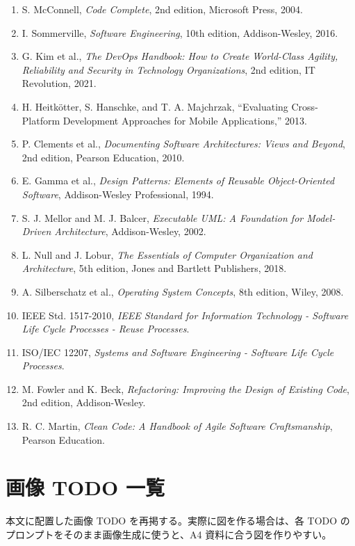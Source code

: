 \documentclass[a4paper,11pt,ja=standard,xelatex]{bxjsarticle}
\begin{document}
\begin{enumerate}
  \item S. McConnell, \textit{Code Complete}, 2nd edition, Microsoft Press, 2004.
  \item I. Sommerville, \textit{Software Engineering}, 10th edition, Addison-Wesley, 2016.
  \item G. Kim et al., \textit{The DevOps Handbook: How to Create World-Class Agility, Reliability and Security in Technology Organizations}, 2nd edition, IT Revolution, 2021.
  \item H. Heitkötter, S. Hanschke, and T. A. Majchrzak, ``Evaluating Cross-Platform Development Approaches for Mobile Applications,'' 2013.
  \item P. Clements et al., \textit{Documenting Software Architectures: Views and Beyond}, 2nd edition, Pearson Education, 2010.
  \item E. Gamma et al., \textit{Design Patterns: Elements of Reusable Object-Oriented Software}, Addison-Wesley Professional, 1994.
  \item S. J. Mellor and M. J. Balcer, \textit{Executable UML: A Foundation for Model-Driven Architecture}, Addison-Wesley, 2002.
  \item L. Null and J. Lobur, \textit{The Essentials of Computer Organization and Architecture}, 5th edition, Jones and Bartlett Publishers, 2018.
  \item A. Silberschatz et al., \textit{Operating System Concepts}, 8th edition, Wiley, 2008.
  \item IEEE Std. 1517-2010, \textit{IEEE Standard for Information Technology - Software Life Cycle Processes - Reuse Processes}.
  \item ISO/IEC 12207, \textit{Systems and Software Engineering - Software Life Cycle Processes}.
  \item M. Fowler and K. Beck, \textit{Refactoring: Improving the Design of Existing Code}, 2nd edition, Addison-Wesley.
  \item R. C. Martin, \textit{Clean Code: A Handbook of Agile Software Craftsmanship}, Pearson Education.
\end{enumerate}

\section{画像 TODO 一覧}

本文に配置した画像 TODO を再掲する。実際に図を作る場合は、各 TODO のプロンプトをそのまま画像生成に使うと、A4 資料に合う図を作りやすい。
\end{document}
